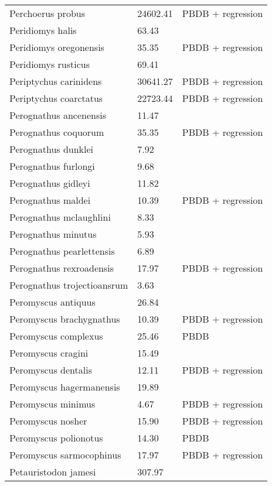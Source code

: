 \begin{center}
\begin{longtable}{p{} p{} p{} }
  Perchoerus probus & 24602.41 & PBDB + regression \\ 
  Peridiomys halis & 63.43 & \cite{Tomiya2013} \\ 
  Peridiomys oregonensis & 35.35 & PBDB + regression \\ 
  Peridiomys rusticus & 69.41 & \cite{Tomiya2013} \\ 
  Periptychus carinidens & 30641.27 & PBDB + regression \\ 
  Periptychus coarctatus & 22723.44 & PBDB + regression \\ 
  Perognathus ancenensis & 11.47 & \cite{Tomiya2013} \\ 
  Perognathus coquorum & 35.35 & PBDB + regression \\ 
  Perognathus dunklei & 7.92 & \cite{Tomiya2013} \\ 
  Perognathus furlongi & 9.68 & \cite{Tomiya2013} \\ 
  Perognathus gidleyi & 11.82 & \cite{Tomiya2013} \\ 
  Perognathus maldei & 10.39 & PBDB + regression \\ 
  Perognathus mclaughlini & 8.33 & \cite{Tomiya2013} \\ 
  Perognathus minutus & 5.93 & \cite{Tomiya2013} \\ 
  Perognathus pearlettensis & 6.89 & \cite{Tomiya2013} \\ 
  Perognathus rexroadensis & 17.97 & PBDB + regression \\ 
  Perognathus trojectioansrum & 3.63 & \cite{Tomiya2013} \\ 
  Peromyscus antiquus & 26.84 & \cite{Tomiya2013} \\ 
  Peromyscus brachygnathus & 10.39 & PBDB + regression \\ 
  Peromyscus complexus & 25.46 & PBDB \\ 
  Peromyscus cragini & 15.49 & \cite{Tomiya2013} \\ 
  Peromyscus dentalis & 12.11 & PBDB + regression \\ 
  Peromyscus hagermanensis & 19.89 & \cite{Tomiya2013} \\ 
  Peromyscus minimus & 4.67 & PBDB + regression \\ 
  Peromyscus nosher & 15.90 & PBDB + regression \\ 
  Peromyscus polionotus & 14.30 & PBDB \\ 
  Peromyscus sarmocophinus & 17.97 & PBDB + regression \\ 
  Petauristodon jamesi & 307.97 & \cite{Tomiya2013} \\ 

\end{longtable}
\end{center}
